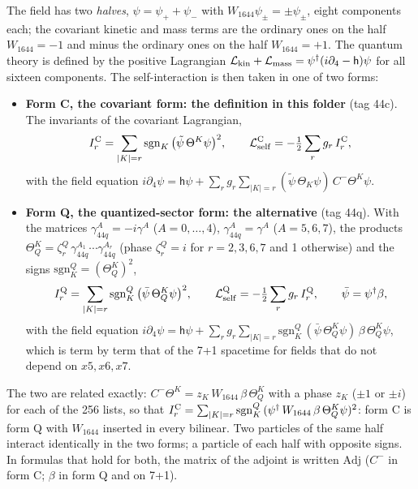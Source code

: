 \documentclass[
  10pt,
]{article}
\providecommand{\tightlist}{%
  \setlength{\itemsep}{0pt}\setlength{\parskip}{0pt}}
\begin{document}
The field has two \emph{halves}, \(\psi=\psi_++\psi_-\) with
\(W_{1644}\psi_\pm=\pm\psi_\pm\), eight components each; the covariant
kinetic and mass terms are the ordinary ones on the half \(W_{1644}=-1\)
and minus the ordinary ones on the half \(W_{1644}=+1\). The quantum
theory is defined by the positive Lagrangian
\(\mathcal L_{\rm kin}+\mathcal L_{\rm mass}=\psi^\dagger(i\partial_4-\mathsf h)\psi\)
for all sixteen components. The self-interaction is then taken in one of
two forms:

\begin{itemize}
\tightlist
\item
  \textbf{Form C, the covariant form: the definition in this folder}
  (tag 44c). The invariants of the covariant Lagrangian,
  \[I_r^{\rm C}=\sum_{|K|=r}\mathrm{sgn}_K\,\big(\tilde\psi\,\Theta^K\psi\big)^2,\qquad
  \mathcal L_{\rm self}^{\rm C}=-\tfrac12\sum_rg_r\,I_r^{\rm C},\] with
  the field equation
  \(i\partial_4\psi=\mathsf h\psi+\sum_rg_r\sum_{|K|=r}(\tilde\psi\,\Theta_K\psi)\,C^-\Theta^K\psi\).
\item
  \textbf{Form Q, the quantized-sector form: the alternative} (tag 44q).
  With the matrices \(\gamma_{44q}^A=-i\gamma^A\) (\(A=0,\dots,4\)),
  \(\gamma_{44q}^A=\gamma^A\) (\(A=5,6,7\)), the products
  \(\Theta_Q^K=\zeta_r^Q\,\gamma_{44q}^{A_1}\cdots\gamma_{44q}^{A_r}\)
  (phase \(\zeta_r^Q=i\) for \(r=2,3,6,7\) and 1 otherwise) and the
  signs \(\mathrm{sgn}_K^Q=(\Theta_Q^K)^2\),
  \[I_r^{\rm Q}=\sum_{|K|=r}\mathrm{sgn}_K^Q\,\big(\bar\psi\,\Theta_Q^K\psi\big)^2,\qquad
  \mathcal L_{\rm self}^{\rm Q}=-\tfrac12\sum_rg_r\,I_r^{\rm Q},\qquad\bar\psi=\psi^\dagger\beta,\]
  with the field equation
  \(i\partial_4\psi=\mathsf h\psi+\sum_rg_r\sum_{|K|=r}\mathrm{sgn}_K^Q\,(\bar\psi\,\Theta_Q^K\psi)\,\beta\,\Theta_Q^K\psi\),
  which is term by term that of the 7+1 spacetime for fields that do not
  depend on \(x5,x6,x7\).
\end{itemize}

The two are related exactly:
\(C^-\Theta^K=z_K\,W_{1644}\,\beta\,\Theta_Q^K\) with a phase \(z_K\)
(\(\pm1\) or \(\pm i\)) for each of the 256 lists, so that
\(I_r^{\rm C}=\sum_{|K|=r}\mathrm{sgn}_K^Q\,(\psi^\dagger\,W_{1644}\,\beta\,\Theta_Q^K\psi)^2\):
form C is form Q with \(W_{1644}\) inserted in every bilinear. Two
particles of the same half interact identically in the two forms; a
particle of each half with opposite signs. In formulas that hold for
both, the matrix of the adjoint is written \(\mathrm{Adj}\) (\(C^-\) in
form C; \(\beta\) in form Q and on 7+1).
\end{document}
